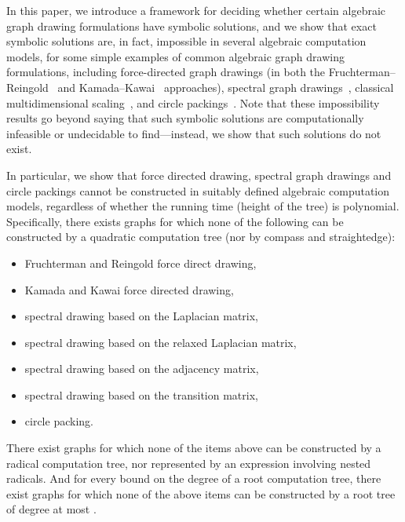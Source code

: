 \documentclass[oribibl,10pt]{llncs}
\begin{document}
In this paper, we introduce a framework for deciding whether certain 
algebraic graph drawing formulations have symbolic solutions, and we show that
exact symbolic solutions are, in fact, impossible in several 
algebraic computation models, for some simple examples
of common algebraic graph drawing formulations, including 
force-directed graph
drawings (in both the Fruchterman--Reingold~\cite{FruRei-SPE-1991} and 
Kamada--Kawai~\cite{KamKaw-IPL-1989} approaches), 
spectral graph drawings~\cite{Kor-CMA-2005}, classical multidimensional scaling~\cite{KruSee-CSG-80}, and 
circle packings~\cite{Koe-BSAWL-36}.
Note that these impossibility 
results go beyond saying that such symbolic solutions are
computationally infeasible or undecidable to find---instead, 
we show that such solutions do not exist.

\ifFull
In particular,
we show that force directed drawing, spectral graph drawings and circle
packings cannot be constructed in suitably defined algebraic computation models, regardless of whether the running time (height of the tree) is polynomial. Specifically, there exists graphs for 
which none of the following 
can be constructed by a quadratic computation tree (nor by compass and straightedge):
\begin{itemize}
\item Fruchterman and Reingold force direct drawing,
\item Kamada and Kawai force directed drawing,
\item spectral drawing based on the Laplacian matrix,
\item spectral drawing based on the relaxed Laplacian matrix,
\item spectral drawing based on the adjacency matrix,
\item spectral drawing based on the transition matrix,
\item circle packing.
\end{itemize}
There exist graphs for which none of the items above can be constructed by a radical computation tree, nor represented by an expression involving nested radicals. And for every bound  on the degree of a root computation tree, there exist graphs for which none of the above items can be constructed by a root tree of degree at most .
\fi
\end{document}
